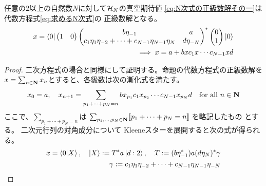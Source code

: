 {	\begin{proposition}[N次式の正級数解]\label{prop:N次式の正級数解} %
		任意の$2$以上の自然数$N$に対して${{\mathcal{H}}}_N$の真空期待値
		\eqref{eq:N次式の正級数解その一}は代数方程式\eqref{eq:求めるN次式}の
		正級数解となる。
		\begin{equation*}\begin{split}
			x = \mathinner{\langle{0}|}\begin{pmatrix}
				1 & 0
			\end{pmatrix}\begin{pmatrix}
				b\eta_{-1} & a \\
				c_1\eta_1\eta_{-2} +\cdots+ c_{N-1}\eta_{N-1}\eta_N & d\eta_{-N} \\
			\end{pmatrix}^*\begin{pmatrix}
				0 \\ 1
			\end{pmatrix}\mathinner{|{0}\rangle} \\
			\implies x = a + bxc_1x\cdots c_{N-1}xd
		\end{split}\end{equation*}
	\end{proposition} %
	\begin{proof} %
		二次方程式の場合と同様にして証明する。命題の代数方程式の正級数解を
		$x=\sum_{n\in\mathbf{N}}x_n$とすると、各級数は次の漸化式を満たす。
		\begin{equation*}\begin{split}
			x_0 = a,\quad 
			x_{n+1} = \sum_{p_1+\cdots+p_N=n} 
				bx_{p_1}c_1x_{p_2}\cdots c_{N-1}x_{p_N}d
				\quad\text{for all } n\in\mathbf{N}
		\end{split}\end{equation*}
		ここで、$\sum_{p_1+\cdots+p_N=n}$は
		$\sum_{p_1,\dots,p_N\in\mathbf{N}}[\![p_1+\cdots+p_N=n]\!]\;$を略記したもの
		とする。
		二次元行列の対角成分について
		Kleeneスターを展開すると次の式が得られる。
		\begin{equation*}\begin{split}
			x = \mathinner{\langle{0|X}\rangle},\quad
			\mathinner{|{X}\rangle} := T^*a\mathinner{|{d:2}\rangle},\quad
			T := (b\eta_{-1}^*)a(d\eta_N)^*\gamma \\
			\gamma := c_1\eta_1\eta_{-2} +\cdots+ c_{N-1}\eta_{N-1}\eta_{-N}
		\end{split}\end{equation*}


\end{proof}}
